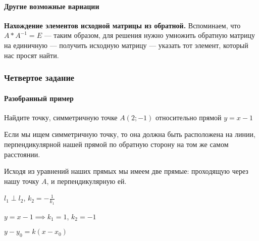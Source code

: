 \documentclass{article}
\begin{document}
\begin{flushleft}
\paragraph{Другие возможные вариации}

\textbf{Нахождение элементов исходной матрицы из обратной.} Вспоминаем, что $A * A^{-1} = E$ — таким образом, для решения нужно умножить обратную матрицу на единичную — получить исходную матрицу — указать тот элемент, который нас просят найти.


\subsubsection{Четвертое задание}

\paragraph{Разобранный пример}

Найдите точку, симметричную точке $A(2; -1)$ относительно прямой $y = x - 1$

\def\size{5} %


Если мы ищем симметричную точку, то она должна быть расположена на линии, перпендикулярной нашей прямой по обратную сторону на том же самом расстоянии.

Исходя из уравнений наших прямых мы имеем две прямые: проходящую через нашу точку $A$, и перпендикулярную ей.

\bigskip

$l_1 \perp l_2$, $k_2 = -\frac{1}{k_1}$

$y = x - 1 \implies k_1 = 1$, $k_2 = -1$

$y - y_0 = k(x - x_0)$


\end{flushleft}
\end{document}
